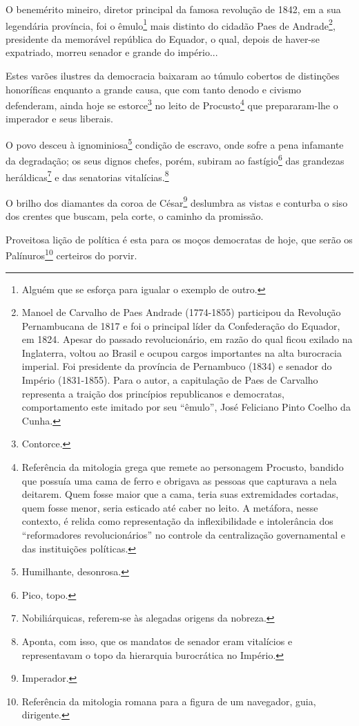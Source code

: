 O benemérito mineiro, diretor principal da famosa revolução de 1842, em
a sua legendária província, foi o êmulo\footnote{Alguém que se esforça
  para igualar o exemplo de outro.} mais distinto do cidadão Paes de
Andrade\footnote{Manoel de Carvalho de Paes Andrade (1774-1855)
  participou da Revolução Pernambucana de 1817 e foi o principal líder
  da Confederação do Equador, em 1824. Apesar do passado revolucionário,
  em razão do qual ficou exilado na Inglaterra, voltou ao Brasil e
  ocupou cargos importantes na alta burocracia imperial. Foi presidente
  da província de Pernambuco (1834) e senador do Império (1831-1855).
  Para o autor, a capitulação de Paes de Carvalho representa a traição
  dos princípios republicanos e democratas, comportamento este imitado
  por seu ``êmulo'', José Feliciano Pinto Coelho da Cunha.}, presidente da
memorável república do Equador, o qual, depois de haver-se expatriado,
morreu senador e grande do império...

Estes varões ilustres da democracia baixaram ao túmulo cobertos de
distinções honoríficas enquanto a grande causa, que com tanto denodo e
civismo defenderam, ainda hoje se estorce\footnote{Contorce.} no leito
de Procusto\footnote{Referência da mitologia grega que remete ao
  personagem Procusto, bandido que possuía uma cama de ferro e obrigava
  as pessoas que capturava a nela deitarem. Quem fosse maior que a cama,
  teria suas extremidades cortadas, quem fosse menor, seria esticado até
  caber no leito. A metáfora, nesse contexto, é relida como
  representação da inflexibilidade e intolerância dos ``reformadores
  revolucionários'' no controle da centralização governamental e das
  instituições políticas.} que prepararam-lhe o imperador e seus
liberais.

O povo desceu à ignominiosa\footnote{Humilhante, desonrosa.} condição
de escravo, onde sofre a pena infamante da degradação; os seus dignos
chefes, porém, subiram ao fastígio\footnote{Pico, topo.} das grandezas
heráldicas\footnote{Nobiliárquicas, referem-se às alegadas origens da
  nobreza.} e das senatorias vitalícias.\footnote{Aponta, com isso,
  que os mandatos de senador eram vitalícios e representavam o topo da
  hierarquia burocrática no Império.}

O brilho dos diamantes da coroa de César\footnote{Imperador.}
deslumbra as vistas e conturba o siso dos crentes que buscam, pela
corte, o caminho da promissão.

Proveitosa lição de política é esta para os moços democratas de hoje,
que serão os Palínuros\footnote{Referência da mitologia romana para a
  figura de um navegador, guia, dirigente.} certeiros do porvir.

